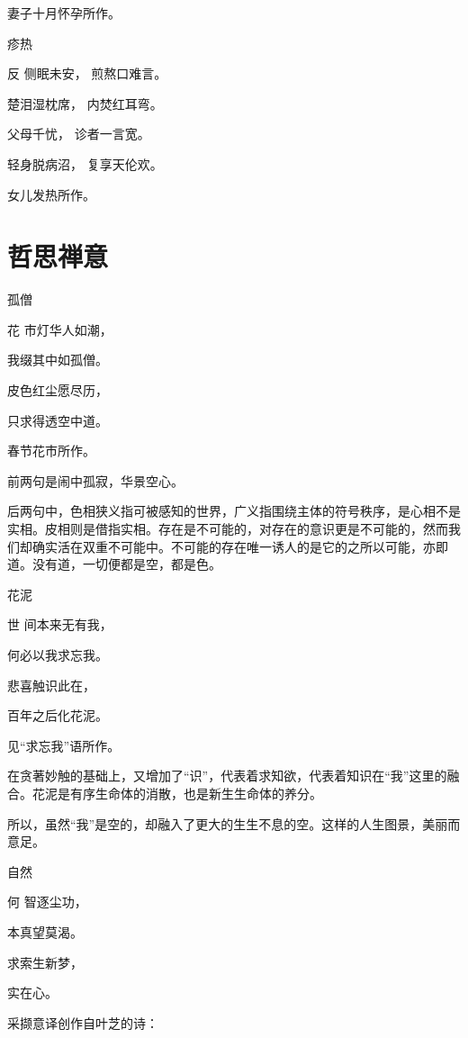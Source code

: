 \documentclass{article}
\newenvironment{poem}[3]{
\begin{minipage}{\textwidth}
\begin{pinyinscope}\begin{center}\Large\linespread{1.4}\selectfont #2\end{center}\end{pinyinscope}
\begin{pinyinscope}
	\begin{center}
	\Large\linespread{1.4}\rmfamily\selectfont #3
}{\end{center}
\end{pinyinscope}
\end{minipage}
}
\begin{document}
妻子十月怀孕所作。

\begin{poem}{}{疹热}
反侧眠未安，
煎熬口难言。

楚泪湿枕席，
内焚红耳弯。

父母千{}忧，
诊者一言宽。

轻身脱病沼，
复享天伦欢。
\end{poem}

女儿发热所作。

\section{哲思禅意}

\begin{poem}{}{孤僧}
花市灯华人如潮，

我缀其中如孤僧。

皮色红尘愿尽历，

只求得透空中道。
\end{poem}

春节花市所作。

前两句是闹中孤寂，华景空心。

后两句中，色相狭义指可被感知的世界，广义指围绕主体的符号秩序，是心相不是实相。皮相则是借指实相。存在是不可能的，对存在的意识更是不可能的，然而我们却确实活在双重不可能中。不可能的存在唯一诱人的是它的之所以可能，亦即道。没有道，一切便都是空，都是色。

\begin{poem}{}{花泥}
世间本来无有我，

何必以我求忘我。

悲喜触识{}此在，

百年之后化花泥。
\end{poem}

见“求忘我”语所作。

在贪著妙触的基础上，又增加了“识”，代表着求知欲，代表着知识在“我”这里的融合。花泥是有序生命体的消散，也是新生生命体的养分。

所以，虽然“我”是空的，却融入了更大的生生不息的空。这样的人生图景，美丽而意足。

\begin{poem}{}{自然}
何智逐尘功，

本真望莫渴。

求索生新梦，

实{}在心{}。
\end{poem}

采撷意译创作自叶芝的诗：
\end{document}
